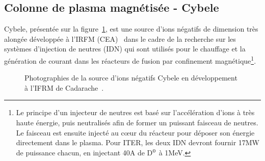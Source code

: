 \begin{refsection}
\section{Colonne de plasma magnétisée - Cybele}
Cybele, présentée sur la figure~\ref{4-cybelePhoto}, est une source d'ions
négatifs de dimension très alongée développée à
l'IRFM (CEA)~\cite{Simonin} dans le cadre de la recherche sur les systèmes
d'injection de neutres (IDN) qui sont utilisés pour le chauffage et la
génération de courant dans les réacteurs de fusion par confinement magnétique\footnote{Le principe d'un
injecteur de neutres est basé sur l'accélération d'ions à très haute énergie,
puis neutralisés afin de former un puissant faisceau de neutres.
Le faisceau est ensuite injecté au c\oe{}ur du réacteur pour déposer son énergie
directement dans le plasma. Pour ITER, les deux IDN devront fournir 17MW de
puissance chacun, en injectant 40A de D$^{{0}}$ à 1MeV.}.
\begin{figure}[!htbp]
  \centering
    \caption{Photographies de la source d'ions négatifs Cybele en développement
    à l'IFRM de Cadarache~\parencite{SimoninHDR}.
    \label{4-cybelePhoto}} 
\end{figure}	


\end{refsection}

